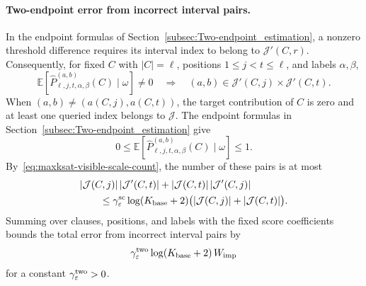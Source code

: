 \paragraph{Two-endpoint error from incorrect interval pairs.}
In the endpoint formulas of Section~\ref{subsec:Two-endpoint_estimation}, a nonzero threshold difference requires its interval index to belong to $\mathcal J'(C,r)$.
Consequently, for fixed $C$ with $|C|=\ell$, positions $1\le j<t\le\ell$, and labels $\alpha,\beta$,
\[
\mathbb E[\widehat P^{(a,b)}_{\ell,j,t,\alpha,\beta}(C)\mid\omega]\neq0
\quad\Longrightarrow\quad
(a,b)\in\mathcal J'(C,j)\times\mathcal J'(C,t).
\]
When $(a,b)\neq(a(C,j),a(C,t))$, the target contribution of $C$ is zero and at least one queried index belongs to $\mathcal J$.
The endpoint formulas in Section~\ref{subsec:Two-endpoint_estimation} give
\[
0\le\mathbb E[\widehat P^{(a,b)}_{\ell,j,t,\alpha,\beta}(C)\mid\omega]\le1.
\]
By~\eqref{eq:maxksat-visible-scale-count}, the number of these pairs is at most
\[
\begin{aligned}
&|\mathcal J(C,j)|\,|\mathcal J'(C,t)|
 +|\mathcal J(C,t)|\,|\mathcal J'(C,j)|\\
&\qquad\le\gamma^{\mathrm{sc}}_\varepsilon\log(K_{\mathrm{base}}+2)
\bigl(|\mathcal J(C,j)|+|\mathcal J(C,t)|\bigr).
\end{aligned}
\]
Summing over clauses, positions, and labels with the fixed score coefficients bounds the total error from incorrect interval pairs by
\[
\gamma^{\mathrm{two}}_\varepsilon\log(K_{\mathrm{base}}+2)\,W_{\mathrm{imp}}
\]
for a constant $\gamma^{\mathrm{two}}_\varepsilon>0$.

